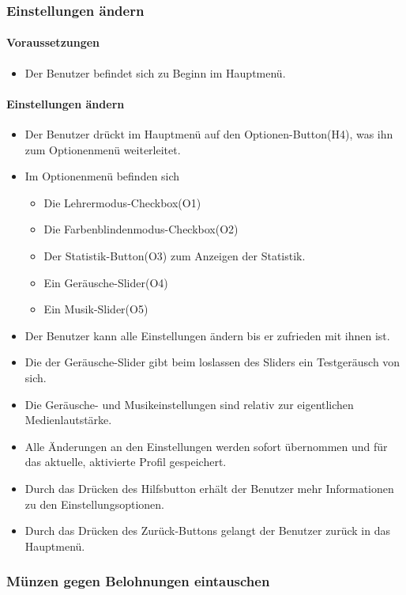 \subsubsection{Einstellungen ändern}
\paragraph{Voraussetzungen}
\begin{itemize}
	\item Der Benutzer befindet sich zu Beginn im Hauptmenü.
\end{itemize}
\paragraph{Einstellungen ändern}
\begin{itemize}
	\item Der Benutzer drückt im Hauptmenü auf den Optionen-Button(H4), was ihn zum Optionenmenü weiterleitet.
	\item Im Optionenmenü befinden sich
	\begin{itemize}
		\item Die Lehrermodus-Checkbox(O1)
		\item Die Farbenblindenmodus-Checkbox(O2)
		\item Der Statistik-Button(O3) zum Anzeigen der Statistik.
		\item Ein Geräusche-Slider(O4)
		\item Ein Musik-Slider(O5)
	\end{itemize}
	\item Der Benutzer kann alle Einstellungen ändern bis er zufrieden mit ihnen ist.
	\item Die der Geräusche-Slider gibt beim loslassen des Sliders ein Testgeräusch von sich.
	\item Die Geräusche- und Musikeinstellungen sind relativ zur eigentlichen Medienlautstärke.
	\item Alle Änderungen an den Einstellungen werden sofort übernommen und für das aktuelle, aktivierte Profil gespeichert.
	\item Durch das Drücken des Hilfsbutton erhält der Benutzer mehr Informationen zu den Einstellungsoptionen.
	\item Durch das Drücken des Zurück-Buttons gelangt der Benutzer zurück in das Hauptmenü.
\end{itemize}

\subsubsection{Münzen gegen Belohnungen eintauschen}
